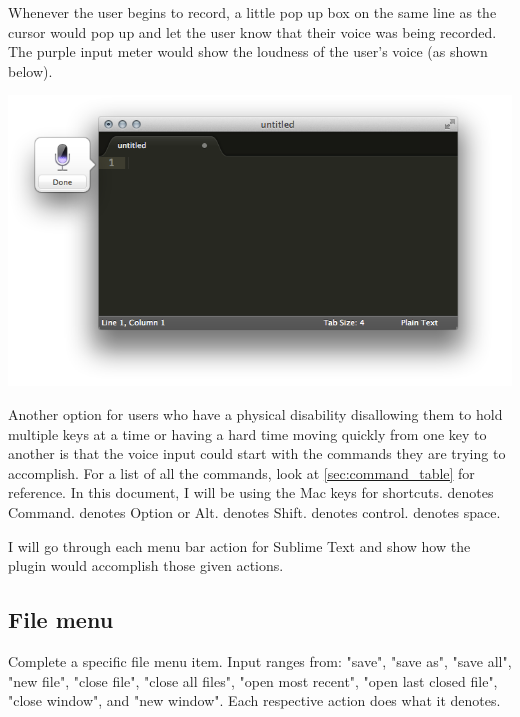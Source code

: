 \documentclass[11pt, oneside]{article}
\begin{document}
Whenever the user begins to record, a little pop up box on the same line as the cursor would pop up and let the user know that their voice was being recorded. The purple input meter would show the loudness of the user's voice (as shown below).
\begin{center}
\includegraphics[width=\textwidth]{dictation.png}
\end{center}

Another option for users who have a physical disability disallowing them to hold multiple keys at a time or having a hard time moving quickly from one key to another is that the voice input could start with the commands they are trying to accomplish. For a list of all the commands, look at \ref{sec:command_table} for reference. In this document, I will be using the Mac keys for shortcuts. \keys{\cmd} denotes Command. \keys{\Alt} denotes Option or Alt. \keys{\shift} denotes Shift. \keys{\ctrl} denotes control. \keys{\Space} denotes space.

I will go through each menu bar action for Sublime Text and show how the plugin would accomplish those given actions.

\subsection{File menu \hfill {}}

Complete a specific file menu item. Input ranges from: "save", "save as", "save all", "new file", "close file", "close all files", "open most recent", "open last closed file", "close window", and "new window". Each respective action does what it denotes.
\end{document}
